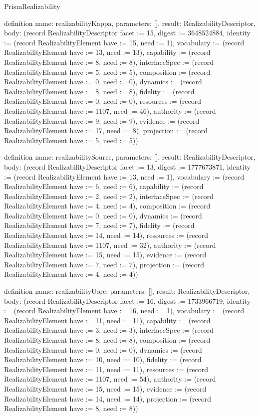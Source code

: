 \begin{lexlean}{PrismRealizability}
\begin{semanticmodule}
definition{
  name: realizabilityKappa,
  parameters: [],
  result: RealizabilityDescriptor,
  body: (record RealizabilityDescriptor {facet := 15, digest := 3648524884, identity := (record RealizabilityElement {have := 15, need := 1}), vocabulary := (record RealizabilityElement {have := 13, need := 13}), capability := (record RealizabilityElement {have := 8, need := 8}), interfaceSpec := (record RealizabilityElement {have := 5, need := 5}), composition := (record RealizabilityElement {have := 0, need := 0}), dynamics := (record RealizabilityElement {have := 8, need := 8}), fidelity := (record RealizabilityElement {have := 0, need := 0}), resources := (record RealizabilityElement {have := 1107, need := 46}), authority := (record RealizabilityElement {have := 9, need := 9}), evidence := (record RealizabilityElement {have := 17, need := 8}), projection := (record RealizabilityElement {have := 5, need := 5})})
}

definition{
  name: realizabilitySource,
  parameters: [],
  result: RealizabilityDescriptor,
  body: (record RealizabilityDescriptor {facet := 13, digest := 1777673871, identity := (record RealizabilityElement {have := 13, need := 1}), vocabulary := (record RealizabilityElement {have := 6, need := 6}), capability := (record RealizabilityElement {have := 2, need := 2}), interfaceSpec := (record RealizabilityElement {have := 4, need := 4}), composition := (record RealizabilityElement {have := 0, need := 0}), dynamics := (record RealizabilityElement {have := 7, need := 7}), fidelity := (record RealizabilityElement {have := 14, need := 14}), resources := (record RealizabilityElement {have := 1107, need := 32}), authority := (record RealizabilityElement {have := 15, need := 15}), evidence := (record RealizabilityElement {have := 7, need := 7}), projection := (record RealizabilityElement {have := 4, need := 4})})
}

definition{
  name: realizabilityUorc,
  parameters: [],
  result: RealizabilityDescriptor,
  body: (record RealizabilityDescriptor {facet := 16, digest := 1733966719, identity := (record RealizabilityElement {have := 16, need := 1}), vocabulary := (record RealizabilityElement {have := 11, need := 11}), capability := (record RealizabilityElement {have := 3, need := 3}), interfaceSpec := (record RealizabilityElement {have := 8, need := 8}), composition := (record RealizabilityElement {have := 0, need := 0}), dynamics := (record RealizabilityElement {have := 10, need := 10}), fidelity := (record RealizabilityElement {have := 11, need := 11}), resources := (record RealizabilityElement {have := 1107, need := 54}), authority := (record RealizabilityElement {have := 15, need := 15}), evidence := (record RealizabilityElement {have := 14, need := 14}), projection := (record RealizabilityElement {have := 8, need := 8})})
}


\end{semanticmodule}
\end{lexlean}
